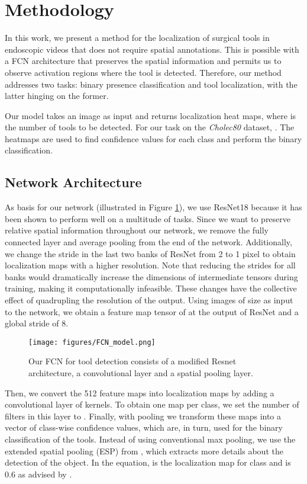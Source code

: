 \documentclass[english,runningheads,a4paper]{llncs}
\begin{document}
\section{Methodology}
In this work, we present a method for the localization of surgical tools in endoscopic videos that does not require spatial annotations. This is possible with a FCN architecture that preserves the spatial information and permits us to observe activation regions where the tool is detected. Therefore, our method addresses two tasks: binary presence classification and tool localization, with the latter hinging on the former.

Our model takes an image as input and returns  localization heat maps, where  is the number of tools to be detected. For our task on the \textit{Cholec80} dataset, . The heatmaps are used to find confidence values for each class and perform the binary classification.

\subsection{Network Architecture}
As basis for our network (illustrated in Figure \ref{fig:model_fcn}), we use ResNet18 \cite{he:cvpr16} because it has been shown to perform well on a multitude of tasks. 
Since we want to preserve relative spatial information throughout our network, we remove the fully connected layer and average pooling from the end of the network. 
Additionally, we change the stride in the last two banks of ResNet from 2 to 1 pixel to obtain localization maps with a higher resolution. Note that reducing the strides for all banks would dramatically increase the dimensions of intermediate tensors during training, making it computationally infeasible.
These changes have the collective effect of quadrupling the resolution of the output. 
Using images of size  as input to the network, we obtain a feature map tensor of  at the output of ResNet and a global stride of 8.

\begin{figure}[t]
    \centering
    \texttt{[image: figures/FCN\_model.png]}
    \caption{Our FCN for tool detection consists of a modified Resnet architecture, a  convolutional layer and a spatial pooling layer.}
    \label{fig:model_fcn}
\end{figure}

Then, we convert the 512 feature maps into localization maps by adding a convolutional layer of  kernels. 
To obtain one map per class, we set the number of filters in this layer to .
Finally, with pooling we transform these maps into a vector of class-wise confidence values, which are, in turn, used for the binary classification of the tools. 
Instead of using conventional max pooling, we use the extended spatial pooling (ESP)  from \cite{durand:cvpr17}, which extracts more details about the detection of the object.
In the equation,  is the localization map for class  and  is 0.6 as advised by \cite{durand:cvpr17}.
\end{document}
